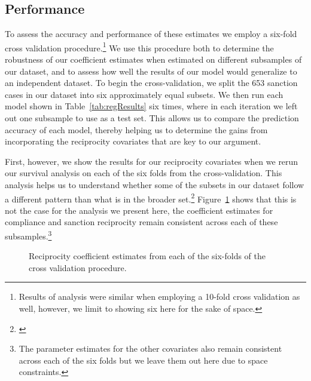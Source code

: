 \subsection*{Performance}

To assess the accuracy and performance of these estimates we employ a six-fold cross validation procedure.\footnote{Results of analysis were similar when employing a 10-fold cross validation as well, however, we limit to showing six here for the sake of space.} We use this procedure both to determine the robustness of our coefficient estimates when estimated on different subsamples of our dataset, and to assess how well the results of our model would generalize to an independent dataset. To begin the cross-validation, we split the 653 sanction cases in our dataset into six approximately equal subsets. We then run each model shown in Table~\ref{tab:regResults} six times, where in each iteration we left out one subsample to use as a test set. This allows us to compare the prediction accuracy of each model, thereby helping us to determine the gains from incorporating the reciprocity covariates that are key to our argument.

First, however, we show the results for our reciprocity covariates when we rerun our survival analysis on each of the six folds from the cross-validation. This analysis helps us to understand whether some of the subsets in our dataset follow a different pattern than what is in the broader set.\footnote{\cite{beck2008time}} Figure~\ref{fig:crossval} shows that this is not the case for the analysis we present here, the coefficient estimates for compliance and sanction reciprocity remain consistent across each of these subsamples.\footnote{The parameter estimates for the other covariates also remain consistent across each of the six folds but we leave them out here due to space constraints.}


\begin{figure}[ht]
	\centering
	\caption{Reciprocity coefficient estimates from each of the six-folds of the cross validation procedure.}
	\resizebox{1\textwidth}{!}{}
	\label{fig:crossval}
\end{figure}


